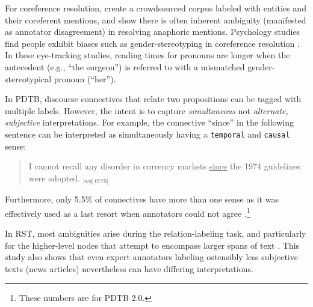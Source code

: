 
For coreference resolution, \citet{Poesio:2019} create a crowdsourced corpus labeled with entities and their coreferent mentions, and show there is often inherent ambiguity (manifested as annotator disagreement) in resolving anaphoric mentions. Psychology studies find people exhibit biases such as gender-stereotyping in coreference resolution \cite{Cunnings:2014,Kennison:2003}. In these eye-tracking studies, reading times for pronouns are longer when the antecedent (e.g., ``the surgeon'') is referred to with a mismatched gender-stereotypical pronoun (``her'').

In PDTB, discourse connectives that relate two propositions can be tagged with multiple labels. However, the intent is to capture \emph{simultaneous} not \emph{alternate, subjective} interpretations.
For example, the connective ``since'' in the following sentence can be interpreted as simultaneously having a \texttt{temporal} and \texttt{causal} sense:
\begin{quote}
  \label{ex:pdtb}
I cannot recall any disorder in currency markets \underline{since} the 1974 guidelines were adopted. $_{\text{[wsj\_0779]}}$
\end{quote}

Furthermore, only 5.5\% of connectives have more than one sense as it was effectively used as a last resort when annotators could not agree \cite{Versley:2011}.\footnote{These numbers are for PDTB 2.0.} 

In RST, most ambiguities arise during the relation-labeling task, and particularly for the higher-level nodes that attempt to encompass larger spans of text \cite{Das:2017}. This study also shows that even expert annotators labeling ostensibly less subjective texts (news articles) nevertheless can have differing interpretations.


